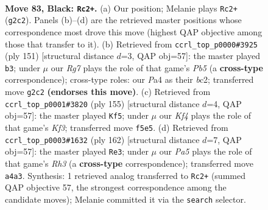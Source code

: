 \documentclass[11pt]{article}
\begin{document}
\clearpage

\begin{figure}[p]\centering
\begin{subfigure}{0.46\textwidth}\centering
\resizebox{\linewidth}{!}{%
\newchessgame
\chessboard[
  setfen={8/8/8/2p2k2/p1Kp4/8/6r1/8 b - - 7 83},
  showmover=false,
  pgfstyle=straightmove, color=movearrow, markmove={g2-c2}
]}
\caption{}
\end{subfigure}\hfill
\begin{subfigure}{0.46\textwidth}\centering
\resizebox{\linewidth}{!}{%
\newchessgame
\chessboard[
  setfen={8/8/8/6p1/1p1k2Kp/8/2B5/8 b - - 15 76},
  showmover=false,
  pgfstyle=straightmove, color=movearrow, markmove={b4-b3}
]}
\caption{}
\end{subfigure}
\\[4pt]
\begin{subfigure}{0.46\textwidth}\centering
\resizebox{\linewidth}{!}{%
\newchessgame
\chessboard[
  setfen={R7/8/5k2/8/5p2/6p1/5pK1/8 b - - 53 78},
  showmover=false,
  pgfstyle=straightmove, color=movearrow, markmove={f6-f5}
]}
\caption{}
\end{subfigure}\hfill
\begin{subfigure}{0.46\textwidth}\centering
\resizebox{\linewidth}{!}{%
\newchessgame
\chessboard[
  setfen={8/6K1/8/8/Pk6/1P5R/8/5r2 w - - 71 82},
  showmover=false,
  pgfstyle=straightmove, color=movearrow, markmove={h3-e3}
]}
\caption{}
\end{subfigure}
\caption{\textbf{Move 83, Black: \texttt{Rc2+}.} (a) Our position; Melanie plays \texttt{Rc2+} (\texttt{g2c2}). Panels (b)--(d) are the retrieved master positions whose correspondence most drove this move (highest QAP objective among those that transfer to it). (b) Retrieved from \texttt{ccrl\_top\_p0000\#3925} (ply 151) [structural distance $d$=3, QAP obj=57]: the master played \texttt{b3}; under $\mu$ our \emph{Rg7} plays the role of that game's \emph{Pb5} (a \textbf{cross-type} correspondence); cross-type roles: our \emph{P}a4 as their \emph{b}c2; transferred move \texttt{g2c2} \textbf{(endorses this move)}. (c) Retrieved from \texttt{ccrl\_top\_p0001\#3820} (ply 155) [structural distance $d$=4, QAP obj=57]: the master played \texttt{Kf5}; under $\mu$ our \emph{Kf4} plays the role of that game's \emph{Kf3}; transferred move \texttt{f5e5}. (d) Retrieved from \texttt{ccrl\_top\_p0003\#1632} (ply 162) [structural distance $d$=7, QAP obj=57]: the master played \texttt{Re3}; under $\mu$ our \emph{Pa5} plays the role of that game's \emph{Rh3} (a \textbf{cross-type} correspondence); transferred move \texttt{a4a3}. Synthesis: 1 retrieved analog transferred to \texttt{Rc2+} (summed QAP objective 57, the strongest correspondence among the candidate moves); Melanie committed it via the \texttt{search} selector.}
\label{fig:thought-m165}
\end{figure}
\end{document}
